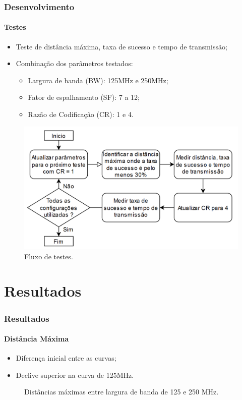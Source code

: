 \documentclass[aspectratio=169]{beamer}
\begin{document}
\begin{frame}

\frametitle{Desenvolvimento}
\framesubtitle{Testes}

\begin{itemize}
    \item Teste de distância máxima, taxa de sucesso e tempo de transmissão;
    \item Combinação dos parâmetros testados:
    \begin{itemize}
        \item Largura de banda (BW): 125MHz e 250MHz;
        \item Fator de espalhamento (SF): 7 a 12;
        \item Razão de Codificação (CR): 1 e 4.
    \end{itemize}
\end{itemize}

\begin{figure}
  \centering
  \includegraphics[scale=0.23]{img/Flux.png}
  \caption{Fluxo de testes.}
\end{figure}

\end{frame}

\section{Resultados}

\begin{frame}

\frametitle{Resultados}
\framesubtitle{Distância Máxima}

\begin{itemize}
    \item Diferença inicial entre as curvas;
    \item Declive superior na curva de 125MHz.
\end{itemize}

\begin{figure}
  \centering
  
  \caption{Distâncias máximas entre largura de banda de 125 e 250 MHz.}
\end{figure}

\end{frame}
\end{document}
